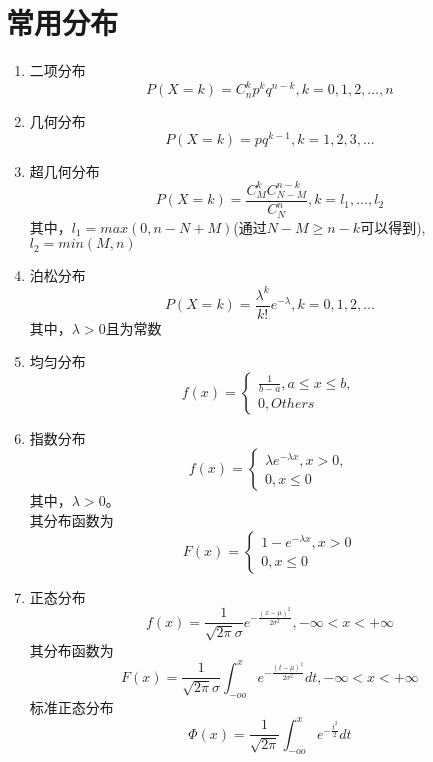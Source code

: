 \section{常用分布}
\begin{enumerate}
	
\item 二项分布
\begin{equation}
	P(X=k) = C_n^kp^kq^{n-k}, k=0, 1, 2, \dots, n
\end{equation}

\item 几何分布
\begin{equation}
	P(X=k) = pq^{k-1}, k=1, 2, 3, ...
\end{equation}

\item 超几何分布
\begin{equation}
P(X=k) = \frac{C_M^kC_{N-M}^{n-k}}{C_N^n}, k = l_1, \dots, l_2
\end{equation}
其中，$l_1 = max(0, n-N+M)$(通过$N-M {\geq} n-k$可以得到), $l_2=min(M,n)$

\item 泊松分布
\begin{equation}
	P(X=k) = \frac{\lambda^k}{k!}e^{-\lambda}, k=0, 1, 2, \dots
\end{equation}
其中，$\lambda>0$且为常数

\item 均匀分布
\[ f(x)=\begin{cases}
\frac{1}{b-a}, a \leq x \leq b, \\
0, Others
\end{cases} \]

\item 指数分布
\[ f(x)=\begin{cases}
\lambda e^{-\lambda x}, x>0, \\
0, x \leq 0
\end{cases} \]
其中，$\lambda>0$。 \\
其分布函数为
\[ F(x)=\begin{cases}
1-e^{-\lambda x}, x>0 \\
0, x \leq 0
\end{cases} \]

\item 正态分布
\begin{equation}
	f(x) = \frac{1}{\sqrt{2\pi} \sigma}e^{-\frac{(x-\mu)^2}{2\sigma^2}}, -\infty < x < +\infty
\end{equation}
其分布函数为
\begin{equation}
	F(x) = \frac{1}{\sqrt{2\pi}\sigma} \int_{-oo}^x  e^{-\frac{(t-\mu)^2}{2\sigma^2}} dt, -\infty < x < +\infty
\end{equation}
标准正态分布
\begin{equation}
	\Phi(x) = \frac{1}{\sqrt{2\pi}} \int_{-oo}^x e^{-\frac{t^2}{2}} dt
\end{equation}







\end{enumerate}






